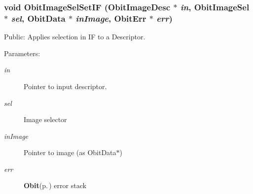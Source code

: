 \subsubsection{\setlength{\rightskip}{0pt plus 5cm}void Obit\-Image\-Sel\-Set\-IF ({\bf Obit\-Image\-Desc} $\ast$ {\em in}, {\bf Obit\-Image\-Sel} $\ast$ {\em sel}, {\bf Obit\-Data} $\ast$ {\em in\-Image}, {\bf Obit\-Err} $\ast$ {\em err})}\label{ObitImageSel_8c_a12}


Public: Applies selection in IF to a Descriptor. 

\begin{Desc}
\item[Parameters:]
\begin{description}
\item[{\em in}]Pointer to input descriptor. \item[{\em sel}]Image selector \item[{\em in\-Image}]Pointer to image (as Obit\-Data$\ast$) \item[{\em err}]{\bf Obit}{\rm (p.\,\pageref{structObit})} error stack \end{description}
\end{Desc}
